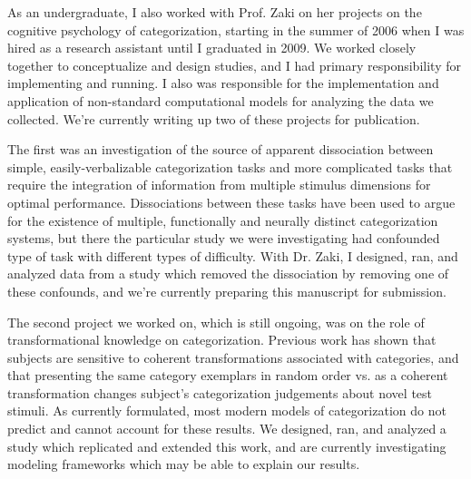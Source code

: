 \documentclass[12pt]{article}
\begin{document}
As an undergraduate, I also worked with Prof. Zaki on her projects on the cognitive psychology of categorization, starting in the summer of 2006 when I was hired as a research assistant until I graduated in 2009.  We worked closely together to conceptualize and design studies, and I had primary responsibility for implementing and running.  I also was responsible for the implementation and application of non-standard computational models for analyzing the data we collected.  We're currently writing up two of these projects for publication.

The first was an investigation of the source of apparent dissociation between simple, easily-verbalizable categorization tasks and more complicated tasks that require the integration of information from multiple stimulus dimensions for optimal performance.  Dissociations between these tasks have been used to argue for the existence of multiple, functionally and neurally distinct categorization systems, but there the particular study we were investigating had confounded type of task with different types of difficulty.  With Dr. Zaki, I designed, ran, and analyzed data from a study which removed the dissociation by removing one of these confounds, and we're currently preparing this manuscript for submission.  

The second project we worked on, which is still ongoing, was on the role of transformational knowledge on categorization.  Previous work has shown that subjects are sensitive to coherent transformations associated with categories, and that presenting the same category exemplars in random order vs. as a coherent transformation changes subject's categorization judgements about novel test stimuli.  As currently formulated, most modern models of categorization do not predict and cannot account for these results.  We designed, ran, and analyzed a study which replicated and extended this work, and are currently investigating modeling frameworks which may be able to explain our results.  
\end{document}
